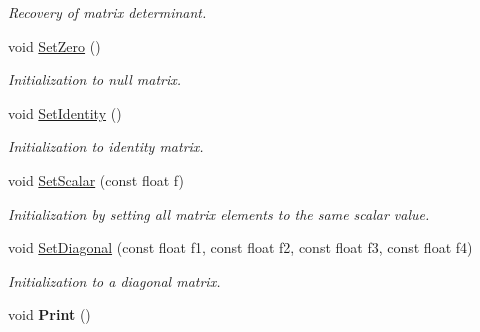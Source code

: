 \begin{DoxyCompactItemize}
\begin{DoxyCompactList}\small\item\em \-Recovery of matrix determinant. \end{DoxyCompactList}\item 
\hypertarget{class_matrix4_df_ad618c9a4c6085ead309d487c147b094f}{
void \hyperlink{class_matrix4_df_ad618c9a4c6085ead309d487c147b094f}{\-Set\-Zero} ()}
\label{class_matrix4_df_ad618c9a4c6085ead309d487c147b094f}

\begin{DoxyCompactList}\small\item\em \-Initialization to null matrix. \end{DoxyCompactList}\item 
\hypertarget{class_matrix4_df_aeaa2ae0ce7fc69f6260a60a274135204}{
void \hyperlink{class_matrix4_df_aeaa2ae0ce7fc69f6260a60a274135204}{\-Set\-Identity} ()}
\label{class_matrix4_df_aeaa2ae0ce7fc69f6260a60a274135204}

\begin{DoxyCompactList}\small\item\em \-Initialization to identity matrix. \end{DoxyCompactList}\item 
\hypertarget{class_matrix4_df_a7621000713ff579f426e362cb85c1e03}{
void \hyperlink{class_matrix4_df_a7621000713ff579f426e362cb85c1e03}{\-Set\-Scalar} (const float f)}
\label{class_matrix4_df_a7621000713ff579f426e362cb85c1e03}

\begin{DoxyCompactList}\small\item\em \-Initialization by setting all matrix elements to the same scalar value. \end{DoxyCompactList}\item 
\hypertarget{class_matrix4_df_a69f275480d89821fc6db2215cff22f57}{
void \hyperlink{class_matrix4_df_a69f275480d89821fc6db2215cff22f57}{\-Set\-Diagonal} (const float f1, const float f2, const float f3, const float f4)}
\label{class_matrix4_df_a69f275480d89821fc6db2215cff22f57}

\begin{DoxyCompactList}\small\item\em \-Initialization to a diagonal matrix. \end{DoxyCompactList}\item 
\hypertarget{class_matrix4_df_a2608d195dcfcf2ef0dec831600b5ecb9}{
void {\bfseries \-Print} ()}
\label{class_matrix4_df_a2608d195dcfcf2ef0dec831600b5ecb9}

\end{DoxyCompactItemize}
